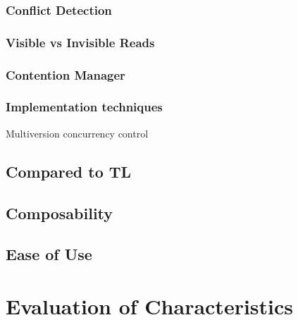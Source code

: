 \subsubsection{Conflict Detection}
\subsubsection{Visible vs Invisible Reads}
\subsubsection{Contention Manager}
\subsubsection{Implementation techniques}
Multiversion concurrency control\\


\subsection{Compared to TL}

\subsection{Composability}
\subsection{Ease of Use}

\section{Evaluation of Characteristics}

\label{sec:stm_eval}

\worksheetend